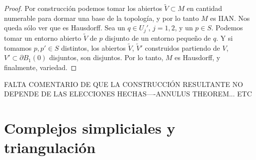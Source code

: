 \documentclass[10pt]{report}
\theoremstyle{definition}
\begin{document}
\begin{proof}
Por construcción podemos tomar los abiertos $\tilde{V} \subset  M$ en cantidad numerable para dormar una base de la topología, y por lo tanto $M$ es IIAN. Nos queda sólo ver que es Hausdorff. Sea un $q\in U_j'$, $j=1,2$, y  un $p\in S$. Podemos tomar un entorno abierto $\tilde{V}$ de $p$ disjunto de un entorno pequeño de $q$. Y si tomamos $p, p' \in S$ distintos, los abiertos $\tilde{V}$, $\tilde{V}'$ construidos partiendo de $V$, $V'\subset \partial B_1(0)$ disjuntos, son disjuntos. Por lo tanto, $M$ es Hausdorff, y finalmente, variedad.

\end{proof}

FALTA COMENTARIO DE QUE LA CONSTRUCCIÓN RESULTANTE NO DEPENDE DE LAS ELECCIONES HECHAS----ANNULUS THEOREM... ETC

\clearpage




\section{Complejos simpliciales y triangulación}\label{sec:simplices}
\end{document}
